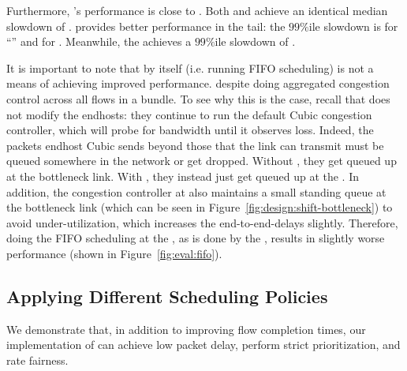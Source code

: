 Furthermore, \name's performance is close to \optimal.
Both \name and \optimal achieve an identical median slowdown of \overviewBenefitsBundlerMedian.
\optimal provides better performance in the tail: the $99\%$ile slowdown is \overviewBenefitsOptimalTail for ``\optimal'' and \overviewBenefitsBundlerTail for \name.
Meanwhile, the \baseline achieves a $99\%$ile slowdown of \overviewBenefitsBaselineTail.

 It is important to note that \name by itself (i.e. running FIFO scheduling) is not a means of achieving improved performance. 
despite doing aggregated congestion control across all flows in a bundle.
To see why this is the case, recall that \name does not modify the endhosts: they continue to run the default Cubic congestion controller, which will probe for bandwidth until it observes loss.
Indeed, the packets endhost Cubic sends beyond those that the link can transmit must be queued somewhere in the network or get dropped. Without \name, they get queued up at the bottleneck link. With \name, they instead just get queued up at the \inbox. In addition, the congestion controller at \inbox also maintains a small standing queue at the bottleneck link (which can be seen in Figure~\ref{fig:design:shift-bottleneck}) to avoid under-utilization, which increases the end-to-end-delays slightly. Therefore, doing the FIFO scheduling at the \name, as is done by the \baseline, results in slightly worse performance (shown in Figure~\ref{fig:eval:fifo}).



\subsection{Applying Different Scheduling Policies}\label{s:eval:policies}
We demonstrate that, in addition to improving flow completion times, our implementation of \name can achieve low packet delay, perform strict prioritization, and rate fairness.

